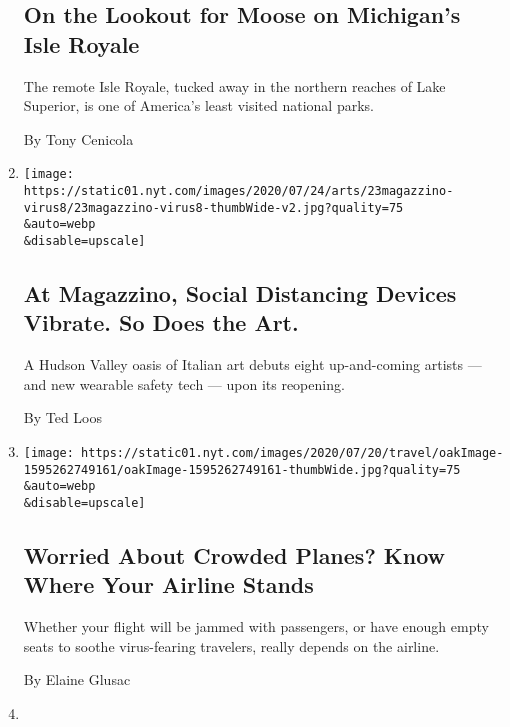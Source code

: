 \begin{enumerate}
{  \subsection{On the Lookout for Moose on Michigan's Isle
  Royale}\label{on-the-lookout-for-moose-on-michigans-isle-royale}}

  The remote Isle Royale, tucked away in the northern reaches of Lake
  Superior, is one of America's least visited national parks.

  By Tony Cenicola
\item
  \href{/2020/07/22/arts/design/magazzino-art-social-distancing-virus.html}{}

  \texttt{[image: https://static01.nyt.com/images/2020/07/24/arts/23magazzino-virus8/23magazzino-virus8-thumbWide-v2.jpg?quality=75\\\&auto=webp\\\&disable=upscale]}

  \hypertarget{at-magazzino-social-distancing-devices-vibrate-so-does-the-art}{%
  \subsection{At Magazzino, Social Distancing Devices Vibrate. So Does
  the
  Art.}\label{at-magazzino-social-distancing-devices-vibrate-so-does-the-art}}

  A Hudson Valley oasis of Italian art debuts eight up-and-coming
  artists --- and new wearable safety tech --- upon its reopening.

  By Ted Loos
\item
  \href{/2020/07/21/travel/crowded-flights-coronavirus.html}{}

  \texttt{[image: https://static01.nyt.com/images/2020/07/20/travel/oakImage-1595262749161/oakImage-1595262749161-thumbWide.jpg?quality=75\\\&auto=webp\\\&disable=upscale]}

  \hypertarget{worried-about-crowded-planes-know-where-your-airline-stands}{%
  \subsection{Worried About Crowded Planes? Know Where Your Airline
  Stands}\label{worried-about-crowded-planes-know-where-your-airline-stands}}

  Whether your flight will be jammed with passengers, or have enough
  empty seats to soothe virus-fearing travelers, really depends on the
  airline.

  By Elaine Glusac
\item
  \href{/2020/07/20/world/asia/bali-tourism-coronavirus.html}{}


\end{enumerate}
